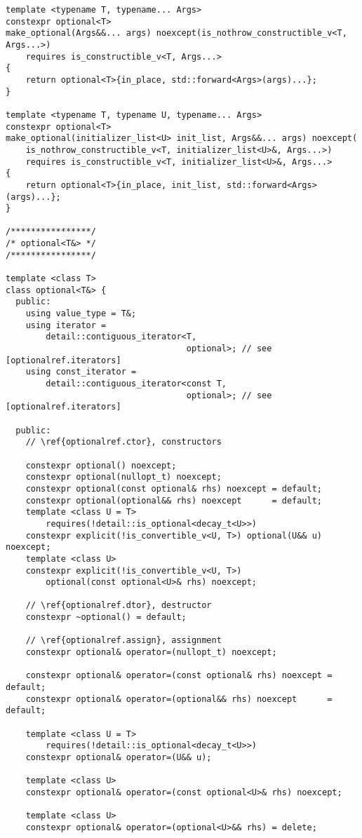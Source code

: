 \documentclass[a4paper,10pt,oneside,openany,final,article]{memoir}
\begin{document}
\begin{verbatim}
template <typename T, typename... Args>
constexpr optional<T>
make_optional(Args&&... args) noexcept(is_nothrow_constructible_v<T, Args...>)
    requires is_constructible_v<T, Args...>
{
    return optional<T>{in_place, std::forward<Args>(args)...};
}

template <typename T, typename U, typename... Args>
constexpr optional<T>
make_optional(initializer_list<U> init_list, Args&&... args) noexcept(
    is_nothrow_constructible_v<T, initializer_list<U>&, Args...>)
    requires is_constructible_v<T, initializer_list<U>&, Args...>
{
    return optional<T>{in_place, init_list, std::forward<Args>(args)...};
}

/****************/
/* optional<T&> */
/****************/

template <class T>
class optional<T&> {
  public:
    using value_type = T&;
    using iterator =
        detail::contiguous_iterator<T,
                                    optional>; // see [optionalref.iterators]
    using const_iterator =
        detail::contiguous_iterator<const T,
                                    optional>; // see [optionalref.iterators]

  public:
    // \ref{optionalref.ctor}, constructors

    constexpr optional() noexcept;
    constexpr optional(nullopt_t) noexcept;
    constexpr optional(const optional& rhs) noexcept = default;
    constexpr optional(optional&& rhs) noexcept      = default;
    template <class U = T>
        requires(!detail::is_optional<decay_t<U>>)
    constexpr explicit(!is_convertible_v<U, T>) optional(U&& u) noexcept;
    template <class U>
    constexpr explicit(!is_convertible_v<U, T>)
        optional(const optional<U>& rhs) noexcept;

    // \ref{optionalref.dtor}, destructor
    constexpr ~optional() = default;

    // \ref{optionalref.assign}, assignment
    constexpr optional& operator=(nullopt_t) noexcept;

    constexpr optional& operator=(const optional& rhs) noexcept = default;
    constexpr optional& operator=(optional&& rhs) noexcept      = default;

    template <class U = T>
        requires(!detail::is_optional<decay_t<U>>)
    constexpr optional& operator=(U&& u);

    template <class U>
    constexpr optional& operator=(const optional<U>& rhs) noexcept;

    template <class U>
    constexpr optional& operator=(optional<U>&& rhs) = delete;


\end{verbatim}
\end{document}
